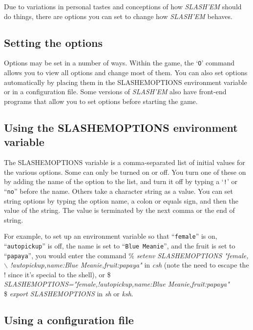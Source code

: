 
Due to variations in personal tastes and conceptions of how {\it SLASH'EM\/}
should do things, there are options you can set to change how {\it SLASH'EM\/}
behaves.
\subsection*{Setting the options}


Options may be set in a number of ways.  Within the game, the `{\tt O}'
command allows you to view all options and change most of them.
You can also set options automatically by placing them in the
SLASHEMOPTIONS environment variable or in a configuration file.
Some versions of {\it SLASH'EM\/} also have front-end programs that allow
you to set options before starting the game.
\subsection*{Using the SLASHEMOPTIONS environment variable}


The SLASHEMOPTIONS variable is a comma-separated list of initial
values for the various options.  Some can only be turned on or off.
You turn one of these on by adding the name of the option to the list,
and turn it off by typing a `{\tt !}' or ``{\tt no}'' before the name.  Others take a 
character string as a value.  You can set string options by typing
the option name, a colon or equals sign, and then the value of the string.
The value is terminated by the next comma or the end of string.

For example, to set up an environment variable so that ``{\tt female}'' is on,
``{\tt autopickup}'' is off, the name is set to ``{\tt Blue Meanie}'', and the fruit
is set to ``{\tt papaya}'', you would enter the command
\% {\it setenv SLASHEMOPTIONS "female,$\backslash$ !autopickup,name:Blue Meanie,fruit:papaya"\/}
in {\it csh\/} (note the need to escape the ! since it's special to the shell), or
\$ {\it SLASHEMOPTIONS="female,!autopickup,name:Blue Meanie,fruit:papaya"\/}\\
\$ {\it export SLASHEMOPTIONS\/}
in {\it sh\/} or {\it ksh}.
\subsection*{Using a configuration file}


